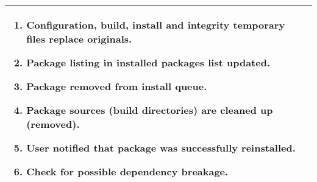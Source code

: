 \begin{tabularx}{\linewidth}{|l|X|}
\begin{minipage}{\linewidth}
\begin{enumerate}
    \item Configuration, build, install and integrity temporary files replace originals.
    \item Package listing in installed packages list updated.
    \item Package removed from install queue.
    \item Package sources (build directories) are cleaned up (removed).
    \item User notified that package was successfully reinstalled.
    \item Check for possible dependency breakage. 
  \end{enumerate}
  \vspace{0.02em}
\end{minipage}
\\
\hline
\end{tabularx}

